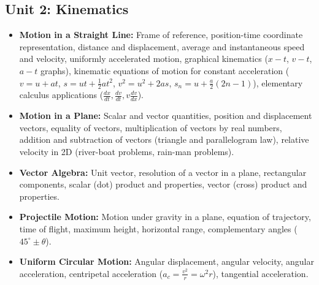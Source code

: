 \documentclass[11pt,a4paper]{article}
\begin{document}
\subsection{Unit 2: Kinematics}
\begin{itemize}
  \item \textbf{Motion in a Straight Line:} Frame of reference, position-time coordinate representation, distance and displacement, average and instantaneous speed and velocity, uniformly accelerated motion, graphical kinematics ($x-t$, $v-t$, $a-t$ graphs), kinematic equations of motion for constant acceleration ($v=u+at$, $s=ut+\frac{1}{2}at^2$, $v^2=u^2+2as$, $s_n=u+\frac{a}{2}(2n-1)$), elementary calculus applications ($\frac{dx}{dt}, \frac{dv}{dt}, v\frac{dv}{dx}$).
  \item \textbf{Motion in a Plane:} Scalar and vector quantities, position and displacement vectors, equality of vectors, multiplication of vectors by real numbers, addition and subtraction of vectors (triangle and parallelogram law), relative velocity in 2D (river-boat problems, rain-man problems).
  \item \textbf{Vector Algebra:} Unit vector, resolution of a vector in a plane, rectangular components, scalar (dot) product and properties, vector (cross) product and properties.
  \item \textbf{Projectile Motion:} Motion under gravity in a plane, equation of trajectory, time of flight, maximum height, horizontal range, complementary angles ($45^\circ \pm \theta$).
  \item \textbf{Uniform Circular Motion:} Angular displacement, angular velocity, angular acceleration, centripetal acceleration ($a_c = \frac{v^2}{r} = \omega^2 r$), tangential acceleration.
\end{itemize}
\end{document}
